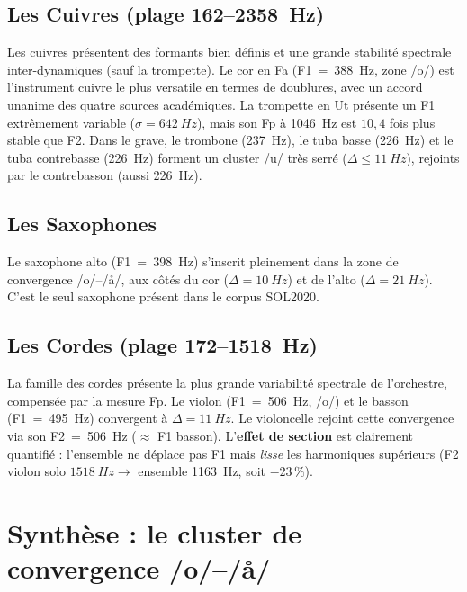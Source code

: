 \documentclass[11pt,a4paper]{article}
\begin{document}
\subsection{Les Cuivres (plage 162--\SI{2358}{Hz})}

Les cuivres présentent des formants bien définis et une grande stabilité
spectrale inter-dynamiques (sauf la trompette). Le cor en Fa
(F1~=~\SI{388}{Hz}, zone /o/) est l'instrument cuivre le plus versatile
en termes de doublures, avec un accord unanime des quatre sources
académiques. La trompette en Ut présente un F1 extrêmement variable
($\sigma = \SI{642}{Hz}$), mais son Fp à \SI{1046}{Hz} est $10{,}4$
fois plus stable que F2. Dans le grave, le trombone (\SI{237}{Hz}), le
tuba basse (\SI{226}{Hz}) et le tuba contrebasse (\SI{226}{Hz}) forment
un cluster /u/ très serré ($\Delta \leq \SI{11}{Hz}$), rejoints par le
contrebasson (aussi \SI{226}{Hz}).

\subsection{Les Saxophones}

Le saxophone alto (F1~=~\SI{398}{Hz}) s'inscrit pleinement dans la zone
de convergence /o/--/\r{a}/, aux côtés du cor ($\Delta = \SI{10}{Hz}$)
et de l'alto ($\Delta = \SI{21}{Hz}$). C'est le seul saxophone présent
dans le corpus SOL2020.

\subsection{Les Cordes (plage 172--\SI{1518}{Hz})}

La famille des cordes présente la plus grande variabilité spectrale de
l'orchestre, compensée par la mesure Fp. Le violon
(F1~=~\SI{506}{Hz}, /o/) et le basson (F1~=~\SI{495}{Hz}) convergent à
$\Delta = \SI{11}{Hz}$. Le violoncelle rejoint cette convergence via son
F2~=~\SI{506}{Hz} ($\approx$ F1 basson). L'\textbf{effet de section}
est clairement quantifié : l'ensemble ne déplace pas F1 mais
\emph{lisse} les harmoniques supérieurs (F2 violon solo
$\SI{1518}{Hz} \to$ ensemble \SI{1163}{Hz}, soit $-23\,\%$).


\section{Synthèse : le cluster de convergence /o/--/\r{a}/}
\end{document}
